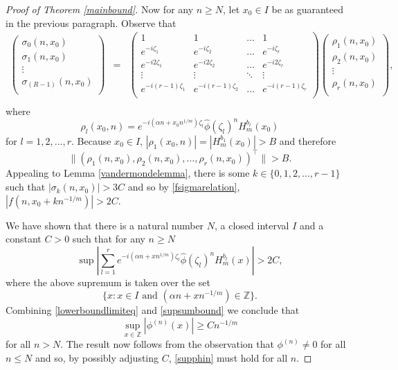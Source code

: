 \documentclass{article}
\theoremstyle{theorem}
\theoremstyle{remark}
\begin{document}
\begin{proof}[Proof of Theorem \ref{mainbound}]
Now for any $n\geq N$, let $x_0\in I$ be as guaranteed in the previous paragraph. Observe that
\begin{eqnarray*}
\begin{pmatrix}
\sigma_0(n,x_0)\\
\sigma_1(n,x_0)\\
\vdots \\
\sigma_{(R-1)}(n,x_0)\\
\end{pmatrix}
&=&
\begin{pmatrix}
1 &  1  & \ldots & 1\\
e^{-i\zeta_1}  &  e^{-i\zeta_2} & \ldots & e^{-i\zeta_r}\\
e^{-i2\zeta_1}  &  e^{-i2\zeta_2} & \ldots & e^{-i2\zeta_r}\\
\vdots & \vdots & \ddots & \vdots\\
e^{-i(r-1)\zeta_1}  &  e^{-i(r-1)\zeta_2} & \ldots & e^{-i(r-1)\zeta_r}\\
\end{pmatrix}
\begin{pmatrix}
\rho_1(n,x_0) \\
\rho_2(n,x_0)\\
\vdots\\
\rho_r(n,x_0)\\
\end{pmatrix},\\
\end{eqnarray*}
where
\begin{equation*} 
\rho_l(x_0,n)=e^{-i(\alpha n+x_0n^{1/m})\zeta_l}\hat{\phi}(\zeta_l)^n
H_m^{b_l}(x_0)
\end{equation*}
for $l=1,2,\dots,r$. Because $x_0\in I$, $|\rho_1(x_0,n)|=|H_m^{b_1}(x_0)|>B$ and therefore
\begin{equation*}
\|(\rho_1(n,x_0),\rho_2(n,x_0),\dots,\rho_r(n,x_0))^{\top}\|>B.
\end{equation*}
Appealing to Lemma \ref{vandermondelemma}, there is some $k\in\{0,1,2,\dots,r-1\}$ such that \break$|\sigma_k(n,x_0)|>3C$ and so by \eqref{fsigmarelation}, $|f(n,x_0+kn^{-1/m})|>2C$.

We have shown that there is a natural number $N$, a closed interval $I$ and a constant $C>0$ such that for any $n\geq N$
\begin{equation}\label{supsumbound}
\sup\left|\sum_{l=1}^{r}e^{-i(\alpha n+xn^{1/m})\zeta_l}\hat{\phi}(\zeta_l)^n
H_m^{b_l}(x)\right|>2C,
\end{equation}
where the above supremum is taken over the set
\begin{equation*}
 \{x:x\in I\mbox{ and }(\alpha n+xn^{-1/m})\in \mathbb{Z}\}.
\end{equation*}
Combining \eqref{lowerboundlimiteq} and \eqref{supsumbound} we
conclude that
\begin{equation}\label{supphin}
\sup_{x\in\mathbb{Z}}|\phi^{(n)}(x)|\geq Cn^{-1/m}
\end{equation}
for all $n>N$. The result now follows from the observation that $\phi^{(n)}\neq
0$ for all $n\leq N$ and so, by possibly adjusting $C$, \eqref{supphin}
must hold for all $n$. 
\end{proof}
\end{document}
